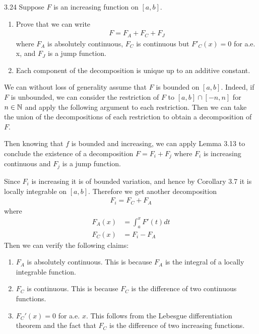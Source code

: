 \documentclass{scrartcl}
\begin{document}
\begin{problem}{3.24}
Suppose $F$ is an increasing function on $[a,b]$. \begin{enumerate}
    \item Prove that we can write \begin{align*}
        F = F_A + F_C + F_J
    \end{align*} where $F_A$ is absolutely continuous, $F_C$ is continuous but $F'_C(x)= 0$ for a.e. x, and $F_J$ is a jump function.
    \item Each component of the decomposition is unique up to an additive constant.
\end{enumerate}
\end{problem}

\begin{solution}
We can without loss of generality assume that $F$ is bounded on $[a,b]$.
Indeed, if $F$ is unbounded, we can consider the restriction of $F$ to $[a,b]\cap [-n,n]$ for $n\in\mathbb{N}$
and apply the following argument to each restriction. 
Then we can take the union of the decompositions of each restriction to obtain a decomposition of $F$.

Then knowing that $f$ is bounded and increasing, we can apply Lemma 3.13 to conclude the
existence of a decomposition $F = F_i + F_j$ where 
$F_i$ is increasing continuous and $F_j$ is a jump function.

Since $F_i$ is increasing it is of bounded variation, and hence by Corollary 3.7
it is locally integrable on $[a,b]$. Therefore 
we get another decomposition 
\begin{align*}
    F_i = F_C + F_A
\end{align*} where \begin{align*}
    F_A(x) &= \int_a^x F'(t)dt \\
    F_C(x) &= F_i - F_A
\end{align*} Then we can verify the following claims:
\begin{enumerate}
    \item $F_A$ is absolutely continuous. This is because $F_A$ is the integral of a locally integrable function.
    \item $F_C$ is continuous. This is because $F_C$ is the difference of two continuous functions.
    \item $F_C'(x) = 0$ for a.e. $x$. This follows from the Lebesgue differentiation theorem and the fact that $F_C$ is the difference of two increasing functions.
\end{enumerate}


\end{solution}
\end{document}
